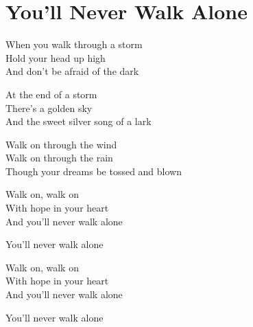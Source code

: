 \section{You'll Never Walk Alone}
When you walk through a storm\\
Hold your head up high\\
And don't be afraid of the dark

At the end of a storm\\
There's a golden sky\\
And the sweet silver song of a lark

Walk on through the wind\\
Walk on through the rain\\
Though your dreams be tossed and blown

Walk on, walk on\\
With hope in your heart\\
And you'll never walk alone

You'll never walk alone

Walk on, walk on\\
With hope in your heart\\
And you'll never walk alone

You'll never walk alone
